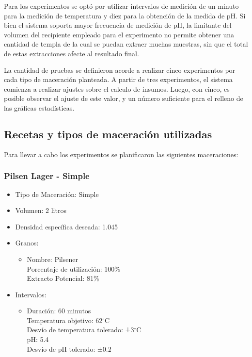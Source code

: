         \par Para los experimentos se optó por utilizar intervalos de medición de un minuto para la medición de temperatura y diez para la obtención de la medida de pH. Si bien el sistema soporta mayor frecuencia de medición de pH, la limitante del volumen del recipiente empleado para el experimento no permite obtener una cantidad de templa de la cual se puedan extraer muchas muestras, sin que el total de estas extracciones afecte al resultado final.
        
        \par La cantidad de pruebas se definieron acorde a realizar cinco experimentos por cada tipo de maceración planteada. A partir de tres experimentos, el sistema comienza a realizar ajustes sobre el calculo de insumos. Luego, con cinco, es posible observar el ajuste de este valor, y un número suficiente para el relleno de las gráficas estadísticas. 
        
    \subsection{Recetas y tipos de maceración utilizadas}
        \par Para llevar a cabo los experimentos se planificaron las siguientes maceraciones:
            \subsubsection{Pilsen Lager - Simple} %
                \begin{itemize}
                    \item Tipo de Maceración: Simple
                    \item Volumen: 2 litros
                    \item Densidad específica deseada: 1.045
                    \item Granos:
                        \begin{itemize}
                            \item Nombre: Pilsener \\
                                Porcentaje de utilización: 100\% \\
                                Extracto Potencial: 81\%
                        \end{itemize}
                    \item Intervalos:
                        \begin{itemize}
                            \item Duración: 60 minutos \\
                             Temperatura objetivo: 62$^{\circ}$C \\
                             Desvío de temperatura tolerado: ±3$^{\circ}$C \\
                             pH: 5.4 \\
                             Desvío de pH tolerado: ±0.2 \\
                        \end{itemize}
                \end{itemize}
                
